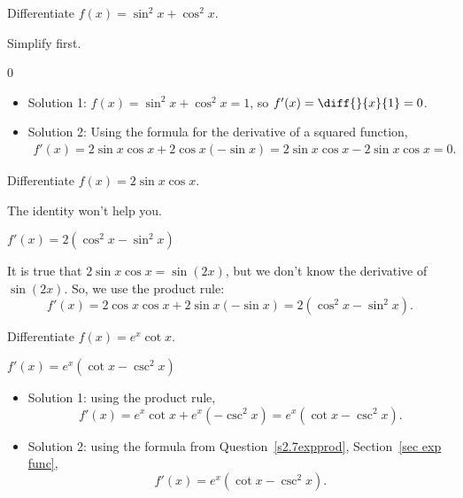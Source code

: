 \begin{Mquestion}
Differentiate $f(x)=\sin^2 x + \cos^2 x$.
\end{Mquestion}
\begin{hint}
Simplify first.
\end{hint}
\begin{answer}
0
\end{answer}
\begin{solution}
\begin{itemize}
\item Solution 1: $f(x)=\sin^2x+\cos^2x=1$, so $f'(x)=\diff{}{x}\{1\}=0$.
\item Solution 2: Using the formula for the derivative of a squared function,
\begin{align*}
f'(x)=2\sin x \cos x + 2\cos x(- \sin x)=2\sin x \cos x - 2 \sin x \cos x =0.
\end{align*}
\end{itemize}
\end{solution}


\begin{question}
Differentiate $f(x)=2\sin x \cos x$.
\end{question}
\begin{hint}
The identity won't help you.
\end{hint}
\begin{answer}
$f'(x)=2(\cos^2 x - \sin ^2 x)$
\end{answer}
\begin{solution}
It is true that $2\sin x \cos x = \sin (2x)$, but we don't know the derivative of $\sin(2x)$. So, we use the product rule: \[f'(x)=2\cos x \cos x+2\sin x (-\sin x)=2(\cos^2 x - \sin ^2 x).\]
\end{solution}


\begin{question}
Differentiate $f(x)=e^x\cot x$.
\end{question}
\begin{answer}
$f'(x)=e^x(\cot x - \csc^2 x)$
\end{answer}
\begin{solution}
\begin{itemize}
\item Solution 1:
 using the product rule,
\[f'(x)=e^x\cot x + e^x(-\csc^2 x)=e^x(\cot x - \csc^2 x).\]
\item Solution 2:
using the formula from Question~\ref{s2.7expprod}, Section~\ref*{sec exp func},
\[f'(x)=e^x(\cot x - \csc^2 x).\]
\end{itemize}
\end{solution}


